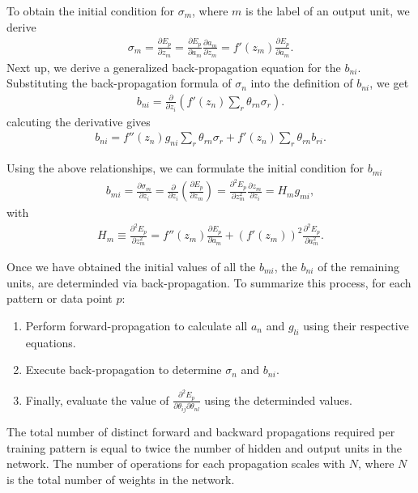 To obtain the initial condition for $\sigma_m$, where $m$ is the label of an output unit, we derive
\begin{align}
\sigma_m =  \frac{\partial E_p}{\partial z_m} = \frac{\partial E_p}{\partial a_m} \frac{\partial a_m}{\partial z_m} = f'(z_m) \frac{\partial E_p}{\partial a_m}.
\end{align}
Next up, we derive a generalized back-propagation equation for the \(b_{ni}\). Substituting the back-propagation formula of \(\sigma_n\) into the definition of \(b_{ni}\), we get
\begin{align}
b_{ni} = \frac{\partial}{\partial z_i} \left( f'(z_n) \sum_r \theta_{rn} \sigma_r \right).
\end{align}
calcuting the derivative gives
\begin{align}
b_{ni} = f''(z_n) g_{ni} \sum_r \theta_{rn} \sigma_r + f'(z_n) \sum_r \theta_{rn} b_{ri}.
\end{align}

Using the above relationships, we can formulate the initial condition for $b_{mi}$
\begin{align}
b_{mi} = \frac{\partial \sigma_m}{\partial z_i} =  \frac{\partial }{\partial z_i}\left(\frac{\partial E_p}{\partial z_m} \right) = \frac{\partial^2 E_p}{\partial z_m^2} \frac{\partial z_m }{\partial z_i} = H_m g_{mi},
\end{align}
with
\begin{align}
H_m \equiv \frac{\partial^2 E_p}{\partial z_m^2} = f''(z_m) \frac{\partial E_p}{\partial a_m} + (f'(z_m))^2 \frac{\partial^2 E_p}{\partial a_m^2}.
\end{align}

Once we have obtained the initial values of all the $b_{mi}$, the
$b_{ni}$ of the remaining units, are determinded via back-propagation.
To summarize this process, for each pattern or data point \( p \):

\begin{enumerate}
    \item Perform forward-propagation to calculate all \( a_n \) and \( g_{li} \) using their respective equations.
    \item Execute back-propagation to determine \( \sigma_n \) and \( b_{ni} \).
    \item Finally, evaluate the value of \(\frac{\partial^2 E_p}{\partial \theta_{ij} \partial \theta_{nl}}\) using the determinded values.
\end{enumerate}

The total number of distinct forward and backward propagations required per training pattern is equal to twice the number of hidden and output units in the network.
The number of operations for each propagation scales with \(N\), where \(N\) is the total number of weights in the network.














